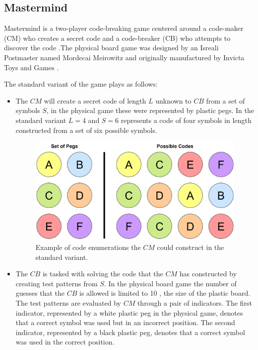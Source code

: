 \documentclass[12pt]{article}  %
\theoremstyle{definition}
\theoremstyle{remark}
\begin{document}
\subsection {Mastermind}

Mastermind is a two-player code-breaking game centered around a code-maker (CM) who creates a secret code and a code-breaker (CB) who attempts to discover the code \cite{Wolfram}.The physical board game was designed by an Isreali Postmaster named Mordecai Meirowitz and originally manufactured by Invicta Toys and Games \cite{Invicta}. 

The standard variant of the game plays as follows:
\begin {itemize}
	\item {The $CM$ will create a secret code of length $L$ unknown to $CB$ from a set of symbols $S$, in the physical game these were represented by plastic pegs. In the standard variant $L=4$ and $S=6$  represents a code of four symbols in length constructed from a set of six possible symbols.}
	\begin{figure}[H]
	\centering
	\includegraphics[scale=0.75]{pegs}
	\caption{ Example of code enumerations the $CM$ could construct in the standard variant.}
	\end{figure}
	\item {The $CB$ is tasked with solving the code that the $CM$ has constructed by creating test patterns from $S$. In the physical board game the number of guesses that the $CB$ is allowed is limited to 10 \cite {Nelson}, the size of the plastic board. The test patterns are evaluated by $CM$ through a pair of indicators. The first indicator, represented by a white plastic peg in the physical game, denotes that a correct symbol was used but in an incorrect position. The second indicator, represented by a black plastic peg, denotes that a correct symbol was used in the correct position.}

\end{itemize}
\end{document}
